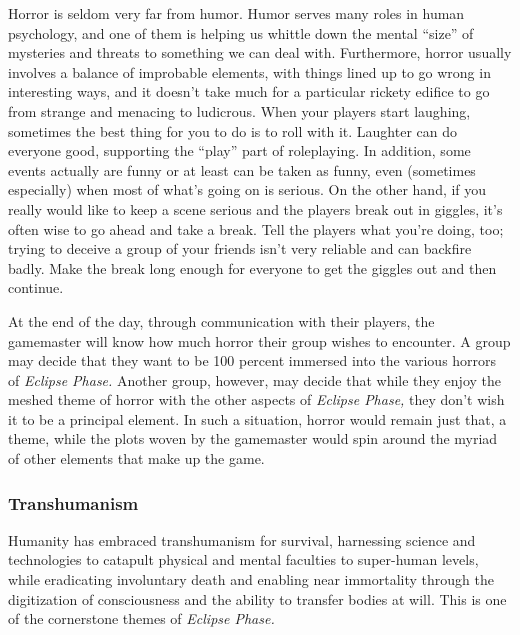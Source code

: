 Horror is seldom very far from humor. Humor 
serves many roles in human psychology, and one of 
them is helping us whittle down the mental ``size'' of 
mysteries and threats to something we can deal with. 
Furthermore, horror usually involves a balance of improbable
elements, with things lined up to go wrong
in interesting ways, and it doesn't take much for a 
particular rickety edifice to go from strange and menacing
to ludicrous. When your players start laughing,
sometimes the best thing for you to do is to roll with 
it. Laughter can do everyone good, supporting the 
``play'' part of roleplaying. In addition, some events 
actually are funny or at least can be taken as funny, 
even (sometimes especially) when most of what's going 
on is serious. On the other hand, if you really would 
like to keep a scene serious and the players break out 
in giggles, it's often wise to go ahead and take a break. 
Tell the players what you're doing, too; trying to deceive
a group of your friends isn't very reliable and
can backfire badly. Make the break long enough for 
everyone to get the giggles out and then continue.

At the end of the day, through communication with 
their players, the gamemaster will know how much 
horror their group wishes to encounter. A group may 
decide that they want to be 100 percent immersed 
into the various horrors of \textit{Eclipse Phase.} Another 
group, however, may decide that while they enjoy 
the meshed theme of horror with the other aspects 
of \textit{Eclipse Phase,} they don't wish it to be a principal 
element. In such a situation, horror would remain just 
that, a theme, while the plots woven by the gamemaster
would spin around the myriad of other elements
that make up the game.

\subsubsection{Transhumanism}

Humanity has embraced transhumanism for survival, 
harnessing science and technologies to catapult physical
and mental faculties to super-human levels, while
eradicating involuntary death and enabling near immortality
through the digitization of consciousness
and the ability to transfer bodies at will. This is one of 
the cornerstone themes of \textit{Eclipse Phase.}

